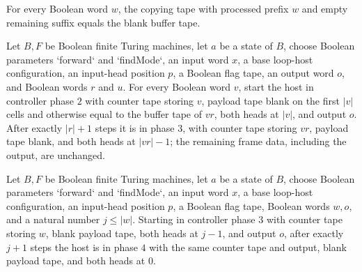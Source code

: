 \begin{lemma}
\label{Turing.FinTM.loopCopy_final}
\leanok
{}
For every Boolean word $w$, the copying tape with processed prefix $w$ and empty
remaining suffix equals the blank buffer tape.
\end{lemma}

\begin{lemma}
\label{Turing.FinTM.loopHost_fuel_copy}
\leanok
{}
Let $B,F$ be Boolean finite Turing machines, let $a$ be a state of $B$, choose Boolean
parameters `forward` and `findMode`, an input word $x$, a base loop-host configuration,
an input-head position $p$, a Boolean flag tape, an output word $o$, and Boolean words
$r$ and $u$. For every Boolean word $v$, start the host in controller phase $2$ with
counter tape storing $v$, payload tape blank on the first $|v|$ cells and otherwise
equal to the buffer tape of $vr$, both heads at $|v|$, and output $o$. After exactly
$|r|+1$ steps it is in phase $3$, with counter tape storing $vr$, payload tape blank,
and both heads at $|vr|-1$; the remaining frame data, including the output, are
unchanged.
\end{lemma}

\begin{lemma}
\label{Turing.FinTM.loopHost_fuel_return}
\leanok
{}
Let $B,F$ be Boolean finite Turing machines, let $a$ be a state of $B$, choose Boolean
parameters `forward` and `findMode`, an input word $x$, a base loop-host configuration,
an input-head position $p$, a Boolean flag tape, Boolean words $w,o$, and a natural
number $j\le |w|$. Starting in controller phase $3$ with counter tape storing $w$, blank
payload tape, both heads at $j-1$, and output $o$, after exactly $j+1$ steps the host is
in phase $4$ with the same counter tape and output, blank payload tape, and both heads
at $0$.
\end{lemma}

